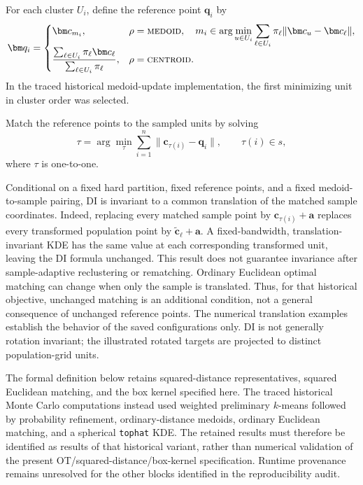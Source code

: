 \State  For each cluster \(U_i\), define the reference point \(\bm q_i\) by
\[
\bm q_i
=
\begin{cases}
\bm c_{m_i}, &
\rho=\textsc{medoid},\quad
m_i\in\displaystyle\arg\min_{u\in U_i}
\sum_{\ell\in U_i}\pi_\ell\|\bm c_u-\bm c_\ell\|, \\[2ex]
\displaystyle
\frac{\sum_{\ell\in U_i}\pi_\ell\bm c_\ell}
{\sum_{\ell\in U_i}\pi_\ell}, &
\rho=\textsc{centroid}.
\end{cases}
\]
In the traced historical medoid-update implementation, the first minimizing unit in cluster order was selected.

\State Match the reference points to the sampled units by solving
\[
\tau
=
\arg\min_{\tau}
\sum_{i=1}^n
\|\bm c_{\tau(i)}-\bm q_i\|,
\qquad
\tau(i)\in s,
\]
where \(\tau\) is one-to-one.

    \item[(iii)] Conditional on a fixed hard partition, fixed reference
points, and a fixed medoid-to-sample pairing, DI is invariant to a common
translation of the matched sample coordinates. Indeed, replacing every
matched sample point by \(\bm c_{\tau(i)}+\bm a\) replaces every transformed
population point by \(\widetilde{\bm c}_\ell+\bm a\). A fixed-bandwidth,
translation-invariant KDE has the same value at each corresponding
transformed unit, leaving the DI formula unchanged. This result does not
guarantee invariance after sample-adaptive reclustering or rematching.
Ordinary Euclidean optimal matching can change when only the sample is
translated. Thus, for that historical objective, unchanged matching is an
additional condition, not a general consequence of unchanged reference points.
The numerical translation examples establish the behavior of the saved
configurations only. DI is not generally rotation invariant; the illustrated
rotated targets are projected to distinct population-grid units.

The formal definition below retains squared-distance representatives,
squared Euclidean matching, and the box kernel specified here. The traced
historical Monte Carlo computations instead used weighted preliminary
\(k\)-means followed by probability refinement, ordinary-distance medoids,
ordinary Euclidean matching, and a spherical \texttt{tophat} KDE.
The retained results must therefore be identified as results of that
historical variant, rather than numerical validation of the present
OT/squared-distance/box-kernel specification. Runtime provenance remains
unresolved for the other blocks identified in the reproducibility audit.

